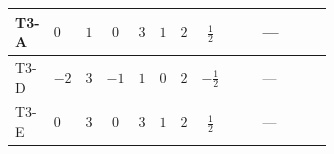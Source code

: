 \documentclass[8pt]{article}
\begin{document}
\begin{landscape}
\begin{longtable}{@{}llcccccc >{\raggedright\arraybackslash}p{0.21\linewidth} >{\raggedright\arraybackslash}p{0.21\linewidth} >{\raggedright\arraybackslash}p{0.21\linewidth}@{}}
\midrule
T3-A & $0$ & $1$ & $0$ & $3$ & $1$ & $2$ & $\frac{1}{2}$ & \scriptsize\adjustbox{max width=\linewidth}{$\begin{gathered} +4 {\lambda_{H1}}^2\end{gathered}$} & --- & \scriptsize\adjustbox{max width=\linewidth}{$\begin{gathered} +10 {\lambda_{S_1}}^2\end{gathered}$} \\
\midrule
T3-D & $-2$ & $3$ & $-1$ & $1$ & $0$ & $2$ & $-\frac{1}{2}$ & \scriptsize\adjustbox{max width=\linewidth}{$\begin{gathered} +4 {\lambda_{H1}}^2\end{gathered}$} & --- & \scriptsize\adjustbox{max width=\linewidth}{$\begin{gathered} +14 {\lambda_{S_1}}^2\end{gathered}$} \\
\midrule
T3-E & $0$ & $3$ & $0$ & $3$ & $1$ & $2$ & $\frac{1}{2}$ & \scriptsize\adjustbox{max width=\linewidth}{$\begin{gathered} +4 {\lambda_{H1}}^2\end{gathered}$} & --- & \scriptsize\adjustbox{max width=\linewidth}{$\begin{gathered} +14 {\lambda_{S_1}}^2\end{gathered}$} \\
\midrule
\bottomrule
\end{longtable}
\clearpage

\end{landscape}
\end{document}
